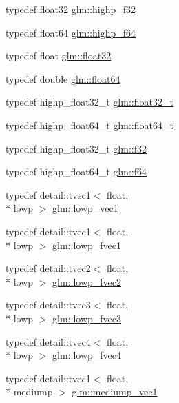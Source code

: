 \begin{DoxyCompactItemize}
typedef float32 \hyperlink{group__gtc__type__precision_ga48d80b6fd3a40b71b2e414493832d1ca}{glm\-::highp\-\_\-f32}
\item 
typedef float64 \hyperlink{group__gtc__type__precision_gab1306a5a8ae99fb2867b548b1546bbe0}{glm\-::highp\-\_\-f64}
\item 
typedef float \hyperlink{group__gtc__type__precision_ga814f2f65354b6588b067cc5c67a6b340}{glm\-::float32}
\item 
typedef double \hyperlink{group__gtc__type__precision_gab721f828b41f46b20cf4883b50733d3b}{glm\-::float64}
\item 
typedef highp\-\_\-float32\-\_\-t \hyperlink{group__gtc__type__precision_ga642737ae3e7c434b366f2191e6944bf2}{glm\-::float32\-\_\-t}
\item 
typedef highp\-\_\-float64\-\_\-t \hyperlink{group__gtc__type__precision_gade966a3eb25ebeb16dd53c40d3fdeb46}{glm\-::float64\-\_\-t}
\item 
typedef highp\-\_\-float32\-\_\-t \hyperlink{group__gtc__type__precision_ga0ec999b57f5330d9021256e96038df04}{glm\-::f32}
\item 
typedef highp\-\_\-float64\-\_\-t \hyperlink{group__gtc__type__precision_ga2bba392e555124b36cde6abba349bab3}{glm\-::f64}
\item 
typedef detail\-::tvec1$<$ float, \\*
lowp $>$ \hyperlink{group__gtc__type__precision_gae48c64f920be353ece773ff367f0161c}{glm\-::lowp\-\_\-vec1}
\item 
typedef detail\-::tvec1$<$ float, \\*
lowp $>$ \hyperlink{group__gtc__type__precision_gad5266f0507395cf8cdfe84b9cf5496e4}{glm\-::lowp\-\_\-fvec1}
\item 
typedef detail\-::tvec2$<$ float, \\*
lowp $>$ \hyperlink{group__gtc__type__precision_gaf365442c52322b810bc0ed943e539229}{glm\-::lowp\-\_\-fvec2}
\item 
typedef detail\-::tvec3$<$ float, \\*
lowp $>$ \hyperlink{group__gtc__type__precision_ga83d77dfe136d4add9e214cd205320c12}{glm\-::lowp\-\_\-fvec3}
\item 
typedef detail\-::tvec4$<$ float, \\*
lowp $>$ \hyperlink{group__gtc__type__precision_ga0d016cdbff067c450122115d0620bf85}{glm\-::lowp\-\_\-fvec4}
\item 
typedef detail\-::tvec1$<$ float, \\*
mediump $>$ \hyperlink{group__gtc__type__precision_ga1b734d715033ab3026b2fb27e1fb7d3e}{glm\-::mediump\-\_\-vec1}

\end{DoxyCompactItemize}
